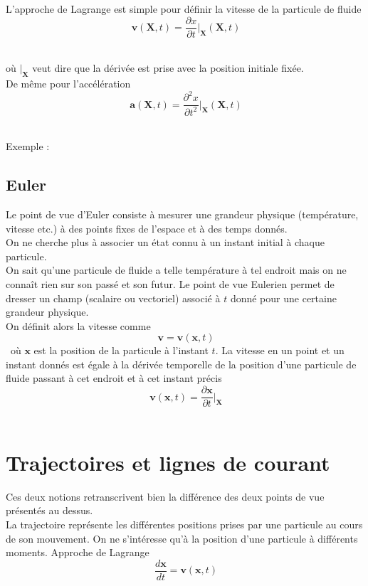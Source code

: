 \documentclass[10pt,a4paper]{book}
\begin{document}
L'approche de Lagrange est simple pour définir la vitesse de la particule de fluide \[\ \mathbf{v}(\mathbf{X},t) = \frac{\partial x}{\partial t}\bigg |_{\mathbf{X}}(\mathbf{X},t) \]\

où $\big |_{\mathbf{X}}$ veut dire que la dérivée est prise avec la position initiale fixée.\\
De même pour l'accélération 
\[\ \mathbf{a}(\mathbf{X},t) = \frac{\partial^2 x}{\partial t^2}\bigg |_{\mathbf{X}}(\mathbf{X},t) \]\

Exemple : 

\subsection{Euler}

Le point de vue d'Euler consiste à mesurer une grandeur physique (température, vitesse etc.) à des points fixes de l'espace et à des temps donnés.\\
On ne cherche plus à associer un état connu à un instant initial à chaque particule.\\

On sait qu'une particule de fluide a telle température à tel endroit mais on ne connaît rien sur son passé et son futur. Le point de vue Eulerien permet de dresser un champ (scalaire ou vectoriel) associé à $t$ donné pour une certaine grandeur physique.\\

On définit alors la vitesse comme \[\ \mathbf{v}=\mathbf{v}(\mathbf{x},t) \]\ où $\mathbf{x}$ est la position de la particule à l'instant $t$. La vitesse en un point et un instant donnés est égale à la dérivée temporelle de la position d'une particule de fluide passant à cet endroit et à cet instant précis \[\ \mathbf{v}(\mathbf{x},t)= \frac{\partial \mathbf{x}}{\partial t}\bigg |_{\mathbf{X}} \]\

\section{Trajectoires et lignes de courant}

Ces deux notions retranscrivent bien la différence des deux points de vue présentés au dessus.\\

La trajectoire représente les différentes positions prises par une particule au cours de son mouvement. On ne s'intéresse qu'à la position d'une particule à différents moments. Approche de Lagrange \[\ \frac{d \mathbf{x}}{dt}=\mathbf{v}(\mathbf{x},t) \]\
\end{document}
